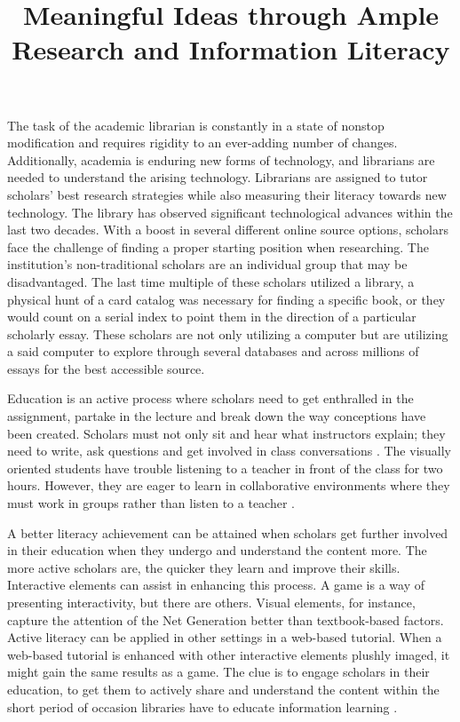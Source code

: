 \documentclass[
    a4paper,
    stu,
    12pt,
   noextraspace,
   floatsintext,
]{APA7}
\title{Meaningful Ideas through Ample Research and Information Literacy}
\begin{document}
\maketitle
The task of the academic librarian is constantly in a state of nonstop modification and requires rigidity to an ever-adding number of changes. Additionally, academia is enduring new forms of technology, and librarians are needed to understand the arising technology. Librarians are assigned to tutor scholars' best research strategies while also measuring their literacy towards new technology. The library has observed significant technological advances within the last two decades. With a boost in several different online source options, scholars face the challenge of finding a proper starting position when researching. The institution's non-traditional scholars are an individual group that may be disadvantaged. The last time multiple of these scholars utilized a library, a physical hunt of a card catalog was necessary for finding a specific book, or they would count on a serial index to point them in the direction of a particular scholarly essay. These scholars are not only utilizing a computer but are utilizing a said computer to explore through several databases and across millions of essays for the best accessible source.

Education is an active process where scholars need to get enthralled in the assignment, partake in the lecture and break down the way conceptions have been created. Scholars must not only sit and hear what instructors explain; they need to write, ask questions and get involved in class conversations \parencite[]{ferlazzo_2021}.
The visually oriented students have trouble listening to a teacher in front of the class for two hours. However, they are eager to learn in collaborative environments where they must work in groups rather than listen to a teacher \parencite[]{francescato2006evaluation}.

A better literacy achievement can be attained when scholars get further involved in their education when they undergo and understand the content more. The more active scholars are, the quicker they learn and improve their skills. Interactive elements can assist in enhancing this process. A game is a way of presenting interactivity, but there are others. Visual elements, for instance, capture the attention of the Net Generation better than textbook-based factors. Active literacy can be applied in other settings in a web-based tutorial. When a web-based tutorial is enhanced with other interactive elements plushly imaged, it might gain the same results as a game. The clue is to engage scholars in their education, to get them to actively share and understand the content within the short period of occasion libraries have to educate information learning \parencite[]{van2010serious}.
\end{document}

